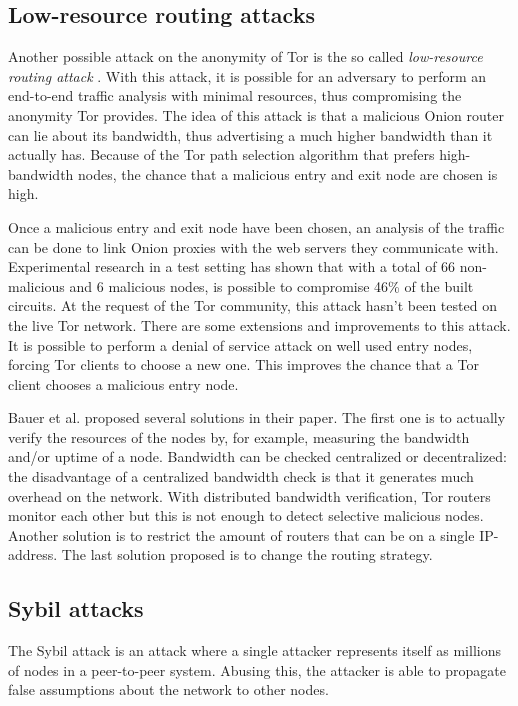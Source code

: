 \documentclass{article}
\begin{document}
	\subsection{Low-resource routing attacks}
		Another possible attack on the anonymity of Tor is the so called \emph{low-resource routing attack} \cite{bauer2007low}. With this attack, it is possible for an adversary to perform an end-to-end traffic analysis with minimal resources, thus compromising the anonymity Tor provides. The idea of this attack is that a malicious Onion router can lie about its bandwidth, thus advertising a much higher bandwidth than it actually has. Because of the Tor path selection algorithm that prefers high-bandwidth nodes, the chance that a malicious entry and exit node are chosen is high.

		Once a malicious entry and exit node have been chosen, an analysis of the traffic can be done to link Onion proxies with the web servers they communicate with. Experimental research in a test setting has shown that with a total of 66 non-malicious and 6 malicious nodes, is possible to compromise 46\% of the built circuits. At the request of the Tor community, this attack hasn't been tested on the live Tor network. There are some extensions and improvements to this attack. It is possible to perform a denial of service attack on well used entry nodes, forcing Tor clients to choose a new one. This improves the chance that a Tor client chooses a malicious entry node. 

		Bauer et al. proposed several solutions in their paper. The first one is to actually verify the resources of the nodes by, for example, measuring the bandwidth and/or uptime of a node. Bandwidth can be checked centralized or decentralized: the disadvantage of a centralized bandwidth check is that it generates much overhead on the network. With distributed bandwidth verification, Tor routers monitor each other but this is not enough to detect selective malicious nodes. Another solution is to restrict the amount of routers that can be on a single IP-address. The last solution proposed is to change the routing strategy.	
		
	\subsection{Sybil attacks}
		The Sybil attack is an attack where a single attacker represents itself as millions of nodes in a peer-to-peer system. Abusing this, the attacker is able to propagate false assumptions about the network to other nodes.
		
\end{document}

